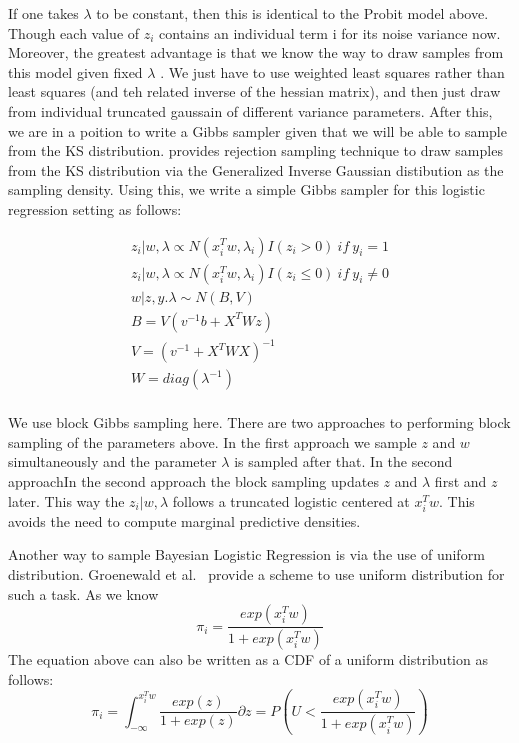 If one takes $\lambda$ to be  constant, then this is identical to the
Probit model above. Though each value of $z_i$ contains an individual term i for
its noise variance now. Moreover, the greatest advantage is that we know the way
to draw samples from this model given fixed $\lambda$ . We just have to use
weighted least squares rather than least squares (and teh related inverse of the 
hessian matrix), and then just draw from individual truncated gaussain of
different variance parameters. After this, we are in a poition to write a
Gibbs sampler given that we will be able to sample from the KS distribution.
\cite{Holmes} provides rejection sampling technique to draw samples 
from the KS distribution via the Generalized Inverse Gaussian distibution as the
sampling density. Using this, we write a simple Gibbs sampler for this
logistic regression setting as follows:

\begin{eqnarray}
z_i|w,\lambda \propto N(x_i^Tw,\lambda_i)I(z_i>0)~if~y_i=1 \\
z_i|w,\lambda \propto N(x_i^Tw,\lambda_i)I(z_i\leq 0)~if~y_i\neq 0 \\
w|z,y.\lambda \sim N(B,V) \\
B = V(v^{-1}b+X^TWz) \\
V=(v^{-1}+X^TWX)^{-1} \\
W=diag(\lambda^{-1}) \\
\end{eqnarray}

We use block Gibbs sampling here. 
There are two approaches to performing block sampling of the parameters above.
In the first approach we sample $z$ and $w$ simultaneously and the parameter
$\lambda$ is sampled after that. In the second approachIn the second approach 
the block sampling updates $z$ and
$\lambda$ first and $z$ later. This way the $z_i|w,\lambda$ follows a
truncated logistic centered at $x_i^Tw$. This avoids the need to compute
marginal predictive densities.    

Another way to sample Bayesian Logistic Regression is via the use of uniform
distribution. Groenewald et al.~\cite{Groenewald2005} provide a scheme to
use uniform distribution for such a task. As we know 
\begin{equation}
\pi_i = \frac{exp(x_i^Tw)}{1+exp(x_i^Tw)}
\end{equation} 
The equation above can also be written as a CDF of a uniform distribution as
follows:
\begin{equation}
\pi_i = \int_{-\infty}^{x_i^Tw} \frac{exp(z)}{1+exp(z)} \partial z =
P(U<\frac{exp(x_i^Tw)}{1+exp(x_i^Tw)})
\label{eqn:uniformSample}
\end{equation}

